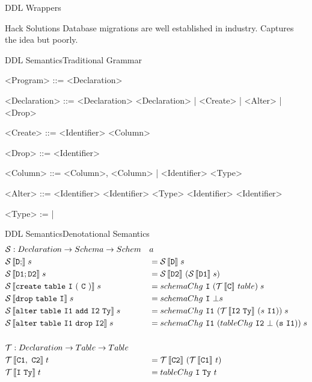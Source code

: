\documentclass{beamer}
\newcommand{\cmp}[2]{
  \mathcal{#1}\,|[ \mathtt{ \StrSubstitute{#2}{ }{\ } } |]
}
\begin{document}
\begin{frame}[fragile]{DDL Wrappers}
  \begin{block}{Hack Solutions}
    Database migrations are well established in industry. Captures the idea but poorly.
  \end{block}

  \begin{example}
    
  \end{example}
\end{frame}

\begin{frame}[fragile]{DDL Semantics}{Traditional Grammar}
  \begin{grammar}
    <Program> ::= <Declaration>\lit*{;}

    <Declaration> ::= <Declaration>\lit*{;} <Declaration> | <Create> | <Alter> | <Drop>

    <Create> ::=  <Identifier> \lit*{(} <Column> \lit*{)}

    <Drop> ::=  <Identifier>

    <Column> ::= <Column>, <Column> | <Identifier> <Type>

    <Alter> ::=  <Identifier>  <Identifier> <Type>
           \alt {} <Identifier>  <Identifier>

    <Type> :=  | 
  \end{grammar}
\end{frame}

\begin{frame}[fragile]{DDL Semantics}{Denotational Semantics}
  \footnotesize
  \begin{alignat*}{2}
    &\mathcal{S} : Declaration -> Schema -> Schem&&a \\
    &\cmp{S}{D;}\; s &&= \cmp{S}{D}\; s \\
    &\cmp{S}{D1;D2}\; s &&= \cmp{S}{D2}\ (\cmp{S}{D1}\; s) \\
    &\cmp{S}{create table I ( C )}\; s &&=
      schemaChg\ \mathtt{I}\ (\cmp{T}{C}\ table)\; s \\
    &\cmp{S}{drop table I}\; s &&=
      schemaChg\ \mathtt{I}\ \bot s \\
    &\cmp{S}{alter table I1 add I2 Ty}\; s &&=
      schemaChg\ \mathtt{I1}\ (\cmp{T}{\mathtt{I2} Ty}\ (s\ \mathtt{I1}))\; s\\
    &\cmp{S}{alter table I1 drop I2}\; s &&=
      schemaChg\ \mathtt{I1}\ (tableChg\ \mathtt{I2}\ \bot\ (\mathtt{s}\ \mathtt{I1}))\; s \\
    \\
    &\mathcal{T} : Declaration -> Table -> Table && \\
    &\cmp{T}{C1, C2}\; t &&= \cmp{T}{C2}\ (\cmp{T}{C1}\ t) \\
    &\cmp{T}{I Ty}\; t &&= tableChg\ \mathtt{I}\ \mathtt{Ty}\ t \\
  \end{alignat*}
  \normalsize
\end{frame}
\end{document}

